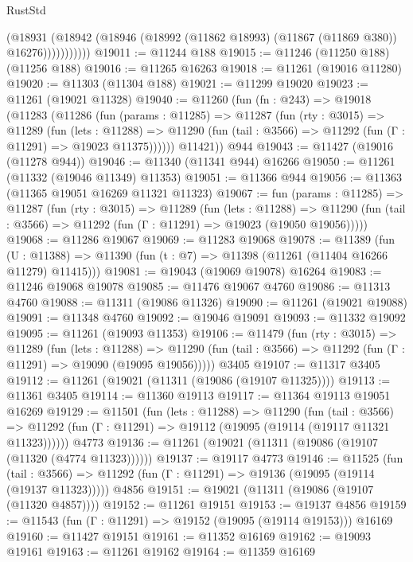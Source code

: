 \begin{lexlean}{RustStd}
\begin{coremodule}
                  (@18931
                    (@18942 (@18946 (@18992 (@11862 @18993) (@11867 (@11869 @380)) @16276)))))))))))
@19011 := @11244 @188
@19015 := @11246 (@11250 @188) (@11256 @188)
@19016 := @11265 @16263
@19018 := @11261 (@19016 @11280)
@19020 := @11303 (@11304 @188)
@19021 := @11299 @19020
@19023 := @11261 (@19021 @11328)
@19040 := @11260
    (fun (fn : @243) =>
    @19018
      (@11283
        (@11286
          (fun (params : @11285) =>
          @11287
            (fun (rty : @3015) =>
            @11289
              (fun (lets : @11288) =>
              @11290 (fun (tail : @3566) => @11292 (fun (Γ : @11291) => @19023 @11375))))))
        @11421))
    @944
@19043 := @11427 (@19016 (@11278 @944))
@19046 := @11340 (@11341 @944) @16266
@19050 := @11261 (@11332 (@19046 @11349) @11353)
@19051 := @11366 @944
@19056 := @11363 (@11365 @19051 @16269 @11321 @11323)
@19067 := fun (params : @11285) =>
  @11287
    (fun (rty : @3015) =>
    @11289
      (fun (lets : @11288) =>
      @11290 (fun (tail : @3566) => @11292 (fun (Γ : @11291) => @19023 (@19050 @19056)))))
@19068 := @11286 @19067
@19069 := @11283 @19068
@19078 := @11389
    (fun (U : @11388) => @11390 (fun (t : @7) => @11398 (@11261 (@11404 @16266 @11279) @11415)))
@19081 := @19043 (@19069 @19078) @16264
@19083 := @11246 @19068 @19078
@19085 := @11476 @19067 @4760
@19086 := @11313 @4760
@19088 := @11311 (@19086 @11326)
@19090 := @11261 (@19021 @19088)
@19091 := @11348 @4760
@19092 := @19046 @19091
@19093 := @11332 @19092
@19095 := @11261 (@19093 @11353)
@19106 := @11479
    (fun (rty : @3015) =>
    @11289
      (fun (lets : @11288) =>
      @11290 (fun (tail : @3566) => @11292 (fun (Γ : @11291) => @19090 (@19095 @19056)))))
    @3405
@19107 := @11317 @3405
@19112 := @11261 (@19021 (@11311 (@19086 (@19107 @11325))))
@19113 := @11361 @3405
@19114 := @11360 @19113
@19117 := @11364 @19113 @19051 @16269
@19129 := @11501
    (fun (lets : @11288) =>
    @11290
      (fun (tail : @3566) =>
      @11292 (fun (Γ : @11291) => @19112 (@19095 (@19114 (@19117 @11321 @11323))))))
    @4773
@19136 := @11261 (@19021 (@11311 (@19086 (@19107 (@11320 (@4774 @11323))))))
@19137 := @19117 @4773
@19146 := @11525
    (fun (tail : @3566) => @11292 (fun (Γ : @11291) => @19136 (@19095 (@19114 (@19137 @11323)))))
    @4856
@19151 := @19021 (@11311 (@19086 (@19107 (@11320 @4857))))
@19152 := @11261 @19151
@19153 := @19137 @4856
@19159 := @11543 (fun (Γ : @11291) => @19152 (@19095 (@19114 @19153))) @16169
@19160 := @11427 @19151
@19161 := @11352 @16169
@19162 := @19093 @19161
@19163 := @11261 @19162
@19164 := @11359 @16169

\end{coremodule}
\end{lexlean}

